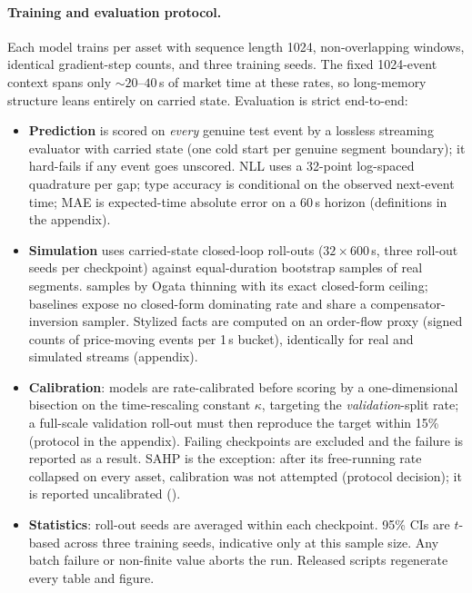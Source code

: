 \paragraph{Training and evaluation protocol.}
Each model trains per asset with sequence length 1024, non-overlapping
windows, identical gradient-step counts, and three training seeds. The fixed
1024-event context spans only ${\sim}20$--$40$\,s of market time at these
rates, so long-memory structure leans entirely on carried state. Evaluation is
strict end-to-end:
\begin{itemize}\setlength\itemsep{1pt}
\item \textbf{Prediction} is scored on \emph{every} genuine test event by a
  lossless streaming evaluator with carried state (one cold start per genuine
  segment boundary); it hard-fails if any event goes unscored. NLL uses a
  32-point log-spaced quadrature per gap; type accuracy is conditional on
  the observed next-event time; MAE is expected-time absolute error on a
  60\,s horizon (definitions in the appendix).
\item \textbf{Simulation} uses carried-state closed-loop roll-outs
  ($32\times600$\,s, three roll-out seeds per checkpoint) against
  equal-duration bootstrap samples of real segments. \ssppp{} samples by
  Ogata thinning with its exact closed-form ceiling; baselines expose no
  closed-form dominating rate and share a compensator-inversion sampler. Stylized facts are computed on an
  order-flow proxy (signed counts of price-moving events per 1\,s bucket),
  identically for real and simulated streams (appendix).
\item \textbf{Calibration}: models are rate-calibrated before scoring by a
  one-dimensional bisection on the time-rescaling constant $\kappa$,
  targeting the \emph{validation}-split rate; a full-scale validation
  roll-out must then reproduce the target within 15\% (protocol in the
  appendix). Failing checkpoints are excluded and the failure is reported as
  a result. SAHP is the exception: after its free-running rate collapsed
  on every asset, calibration was not attempted (protocol decision); it is
  reported uncalibrated (\dag).
\item \textbf{Statistics}: roll-out seeds are averaged within each checkpoint.
  95\% CIs are $t$-based across three training seeds, indicative only at
  this sample size. Any batch failure or non-finite value aborts the run.
  Released scripts regenerate every table and figure.
\end{itemize}



